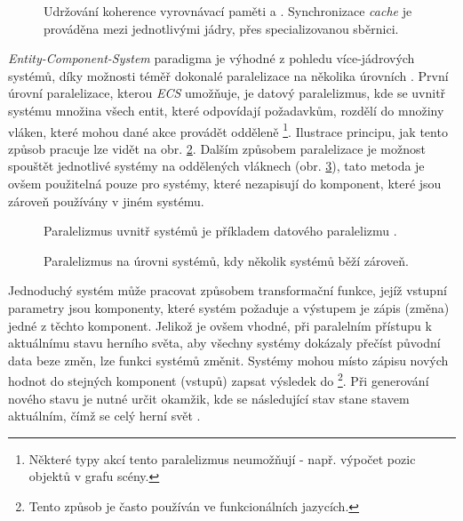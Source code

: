 \begin{figure}
	\caption{Udržování koherence vyrovnávací paměti a  \cite{FalseSharing}. Synchronizace \emph{cache} je prováděna mezi jednotlivými jádry, přes specializovanou sběrnici.}
	\label{Fig:PARFalseSharing}
\end{figure}

\emph{Entity-Component-System} paradigma je výhodné z pohledu více-jádrových systémů, díky možnosti téměř \cite{AmdahlLaw} dokonalé paralelizace na několika úrovních \cite{ParallelGame}. První úrovní paralelizace, kterou \emph{ECS} umožňuje, je datový paralelizmus, kde se uvnitř systému množina všech entit, které odpovídají požadavkům, rozdělí do množiny vláken, které mohou dané akce provádět odděleně \footnote{Některé typy akcí tento paralelizmus neumožňují - např. výpočet pozic objektů v grafu scény.}. Ilustrace principu, jak tento způsob pracuje lze vidět na obr. \ref{Fig:PARData}. Dalším způsobem paralelizace je možnost spouštět jednotlivé systémy na oddělených vláknech (obr. \ref{Fig:PARSystem}), tato metoda je ovšem použitelná pouze pro systémy, které nezapisují do komponent, které jsou zároveň používány v jiném systému. 

\begin{figure}
	\caption{Paralelizmus uvnitř systémů je příkladem datového paralelizmu \cite{KindsOfParallelism}.}
	\label{Fig:PARData}
\end{figure}

\begin{figure}
	\caption{Paralelizmus na úrovni systémů, kdy několik systémů běží zároveň.}
	\label{Fig:PARSystem}
\end{figure}

Jednoduchý systém může pracovat způsobem transformační funkce, jejíž vstupní parametry jsou komponenty, které systém požaduje a výstupem je zápis (změna) jedné z těchto komponent. Jelikož je ovšem vhodné, při paralelním přístupu k aktuálnímu stavu herního světa, aby všechny systémy dokázaly přečíst původní data beze změn, lze funkci systémů změnit. Systémy mohou místo zápisu nových hodnot do stejných komponent (vstupů) zapsat výsledek do  \cite{FrontierThreads} \footnote{Tento způsob je často používán ve funkcionálních jazycích.}. Při generování nového stavu je nutné určit okamžik, kde se následující stav stane stavem aktuálním, čímž se celý herní svět .

